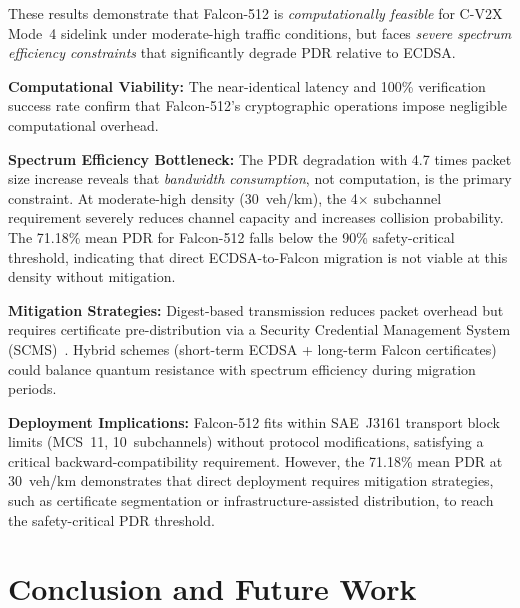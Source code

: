 \documentclass[conference]{IEEEtran}
\begin{document}
These results demonstrate that Falcon-512 is \emph{computationally feasible} for C-V2X Mode~4 sidelink under moderate-high traffic conditions, but faces \emph{severe spectrum efficiency constraints} that significantly degrade PDR relative to ECDSA.

\textbf{Computational Viability:} The near-identical latency and 100\% verification success rate confirm that Falcon-512's cryptographic operations impose negligible computational overhead.

\textbf{Spectrum Efficiency Bottleneck:} The PDR degradation with 4.7 times packet size increase reveals that \emph{bandwidth consumption}, not computation, is the primary constraint. At moderate-high density (30~veh/km), the 4$\times$ subchannel requirement severely reduces channel capacity and increases collision probability. The 71.18\% mean PDR for Falcon-512 falls below the 90\% safety-critical threshold, indicating that direct ECDSA-to-Falcon migration is not viable at this density without mitigation.

\textbf{Mitigation Strategies:} Digest-based transmission reduces packet overhead but requires certificate pre-distribution via a Security Credential Management System (SCMS)~\cite{brecht2018scms}. Hybrid schemes (short-term ECDSA + long-term Falcon certificates) could balance quantum resistance with spectrum efficiency during migration periods.

\textbf{Deployment Implications:} Falcon-512 fits within SAE~J3161 transport block limits (MCS~11, 10~subchannels) without protocol modifications, satisfying a critical backward-compatibility requirement. However, the 71.18\% mean PDR at 30~veh/km demonstrates that direct deployment requires mitigation strategies, such as certificate segmentation or infrastructure-assisted distribution, to reach the safety-critical PDR threshold.

\section{Conclusion and Future Work}

\end{document}
